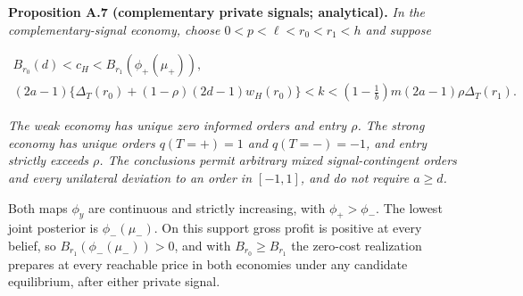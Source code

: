 
\protect{}\label{result-proposition-a-7}{\textbf{Proposition
A.7 (complementary private signals; analytical).}} \emph{In the
complementary-signal economy, choose \(0<p<\ell<r_0<r_1<h\) and suppose}

\[
\begin{gathered}
B_{r_0}(d)<c_H<B_{r_1}(\phi_+(\mu_+)),\\
(2a-1)\{\Delta_T(r_0)+(1-\rho)(2d-1)w_H(r_0)\}<k
<\left(1-\frac1b\right)m(2a-1)\rho\Delta_T(r_1).
\end{gathered}
\tag{A.29}\label{eq:paper-a-29}
\]

\emph{The weak economy has unique zero informed orders and entry
\(\rho\). The strong economy has unique orders \(q(T=+)=1\) and
\(q(T=-)=-1\), and entry strictly exceeds \(\rho\). The conclusions
permit arbitrary mixed signal-contingent orders and every unilateral deviation to an order in \([-1,1]\), and do not require \(a\ge d\).}

Both maps \(\phi_y\) are continuous and strictly increasing, with
\(\phi_+>\phi_-\). The lowest joint posterior is \(\phi_-(\mu_-)\).
On this support gross profit is positive at every belief, so
\(B_{r_1}(\phi_-(\mu_-))>0\), and with \(B_{r_0}\ge B_{r_1}\) the
zero-cost realization prepares at every
reachable price in both economies under any candidate equilibrium, after either private signal.
